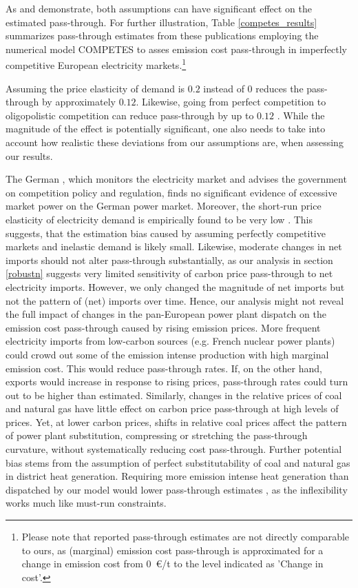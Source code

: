 \documentclass[preprint, 12pt, authoryear]{elsarticle}
\begin{document}
As \citet{Chen2008} and \citet{Lise2010} demonstrate, both assumptions can have significant effect on the estimated pass-through. 
For further illustration, Table \ref{competes_results} summarizes pass-through estimates from these publications employing the numerical model COMPETES to asses emission cost pass-through in imperfectly competitive European electricity markets.\footnote{Please note that reported pass-through estimates are not directly comparable to ours, as (marginal) emission cost pass-through is approximated for a change in emission cost from $0$~\euro{}/t to the level indicated as 'Change in  cost'.}

Assuming the price elasticity of demand is $0.2$ instead of $0$ reduces the pass-through by approximately $0.12$. Likewise, going from perfect competition to oligopolistic competition can reduce pass-through by up to $0.12$ \citep{Lise2010}.
While the magnitude of the effect is potentially significant, one also needs to take into account how realistic these deviations from our assumptions are, when assessing our results. 

The German \citet{MPK2017}, which monitors the electricity market and advises the government on competition policy and regulation, finds no significant evidence of excessive market power on the German power market. 
Moreover, the short‐run price elasticity of electricity demand is empirically found to be very low \citep{Lijesen2007}. 
This suggests, that the estimation bias caused by assuming perfectly competitive markets and inelastic demand is likely small.
Likewise, moderate changes in net imports should not alter pass-through substantially, as our analysis in section \ref{robustn} suggests very limited sensitivity of carbon price pass-through to net electricity imports.
However, we only changed the magnitude of net imports but not the pattern of (net) imports over time. Hence, our analysis might not reveal the full impact of changes in the pan-European power plant dispatch on the emission cost pass-through caused by rising  emission prices.
More frequent electricity imports from low-carbon sources (e.g. French nuclear power plants) could crowd out some of the  emission intense production with high marginal emission cost.
This would reduce pass-through rates.
If, on the other hand, exports would increase in response to rising  prices, pass-through rates could turn out to be higher than estimated.
Similarly, changes in the relative prices of coal and natural gas have little effect on carbon price pass-through at high levels of  prices. Yet, at lower carbon prices, shifts in relative coal prices affect the pattern of power plant substitution, compressing or stretching the pass-through curvature, without systematically reducing cost pass-through. 
Further potential bias stems from the assumption of perfect substitutability of coal and natural gas in district heat generation. Requiring more emission intense heat generation than dispatched by our model would lower pass-through estimates , as the inflexibility works much like must-run constraints.
\end{document}
